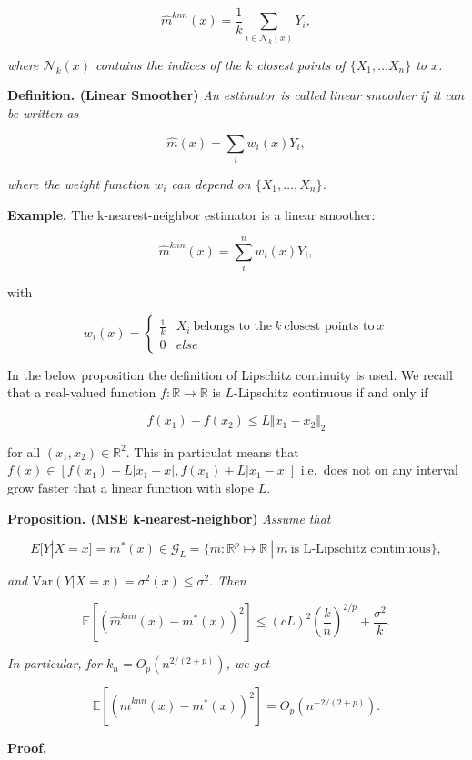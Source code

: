 \documentclass[a4paper,10pt,openany]{book}
\begin{document}
\[
\hat m^{knn}(x)= \frac 1 k \sum_{i \in \mathcal N_k(x)}Y_i,
\]

\emph{where \(\mathcal N_k(x)\) contains the indices of the \(k\) closest points of \(\{X_1, \dots X_n\}\) to \(x\).}

\textbf{Definition. (Linear Smoother)} \emph{An estimator is called linear smoother if it can be written as }

\[
\hat m(x)= \sum_i w_i(x)Y_i,
\]

\emph{where the weight function \(w_i\) can depend on \(\{X_1, \dots, X_n\}\).}

\textbf{Example.} The k-nearest-neighbor estimator is a linear smoother:

\[
\hat m^{knn}(x)= \sum_i^n w_i(x) Y_i,
\]

with

\[
w_i(x)=\begin{cases}\frac 1 k & X_i \ \text{belongs to the}\  k \ \text{closest points to}\  x \\ 0 & else\end{cases}
\]

In the below proposition the definition of Lipschitz continuity is used. We recall that a real-valued function \(f:\mathbb R\to\mathbb R\) is \(L\)-Lipschitz continuous if and only if

\[
f(x_1)-f(x_2)\le L\Vert x_1-x_2\Vert_2
\]

for all \((x_1,x_2)\in\mathbb R^2\). This in particulat means that \(f(x)\in[f(x_1)-L\vert x_1-x\vert,f(x_1)+L\vert x_1-x\vert]\) i.e.~does not on any interval grow faster that a linear function with slope \(L\).

\textbf{Proposition. (MSE k-nearest-neighbor)} \emph{Assume that}

\[
E[Y|X=x]=m^\ast(x)\in \mathcal G_L = \{m: \mathbb R^p \mapsto \mathbb R\ |\ m \ \text{is L-Lipschitz continuous}\},
\]

\emph{and \(\textrm{Var}(Y|X=x)=\sigma^2(x)\leq \sigma^2.\) Then }

\[
\mathbb E[(\hat m^{knn}(x)-m^\ast(x))^2]\leq (cL)^2 \left(\frac k n \right)^{2/p}+\frac {\sigma^2}k.
\]

\emph{In particular, for \(k_n=O_p( n^{2/(2+p)})\), we get }

\[
\mathbb E[(\hat m^{knn}(x)-m^\ast(x))^2]=O_p(n^{-2/(2+p)}).
\]

\textbf{Proof.}
\end{document}
